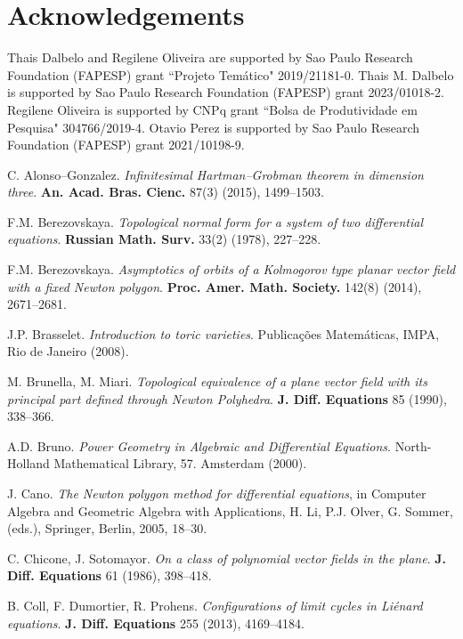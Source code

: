 \documentclass[12pt]{amsart}
\begin{document}
\section{Acknowledgements}

Thais Dalbelo and Regilene Oliveira are  supported by Sao Paulo Research Foundation (FAPESP) grant ``Projeto Tem\'atico" 2019/21181-0. Thais M. Dalbelo is supported by Sao Paulo Research Foundation (FAPESP) grant 2023/01018-2. Regilene Oliveira is supported by CNPq grant ``Bolsa de Produtividade em Pesquisa" 304766/2019-4. Otavio Perez is supported by Sao Paulo Research Foundation (FAPESP) grant 2021/10198-9. 
	
\begin{thebibliography}{99}

 C. Alonso--Gonzalez. \emph{Infinitesimal Hartman--Grobman theorem in dimension three}. \textbf{An. Acad. Bras. Cienc.}  87(3) (2015), 1499--1503.

 F.M. Berezovskaya. \emph{Topological normal form for a system of two differential equations}. \textbf{Russian Math. Surv.} 33(2) (1978), 227--228.

 F.M. Berezovskaya. \emph{Asymptotics of orbits of a Kolmogorov type planar vector field with a fixed Newton polygon}. \textbf{Proc. Amer. Math. Society.} 142(8) (2014), 2671--2681.

 J.P. Brasselet. \emph{Introduction to toric varieties}. Publicações Matemáticas, IMPA, Rio de Janeiro (2008).

 M. Brunella, M. Miari. \emph{Topological equivalence of a plane vector field with its principal part defined through Newton Polyhedra}. \textbf{J. Diff. Equations} 85 (1990), 338--366.

 A.D. Bruno. \emph{Power Geometry in Algebraic and Differential Equations}. North-Holland Mathematical Library, 57. Amsterdam (2000).

 J. Cano. \emph{The Newton polygon method for differential equations}, in Computer Algebra and Geometric Algebra with Applications, H. Li, P.J. Olver, G. Sommer, (eds.), Springer, Berlin, 2005, 18--30.

 C. Chicone, J. Sotomayor. \emph{On a class of polynomial vector fields in the plane}. \textbf{J. Diff. Equations} 61 (1986), 398--418.

 B. Coll, F. Dumortier, R. Prohens. \emph{Configurations of limit cycles in Liénard equations}. \textbf{J. Diff. Equations} 255 (2013), 4169--4184.


\end{thebibliography}
\end{document}
